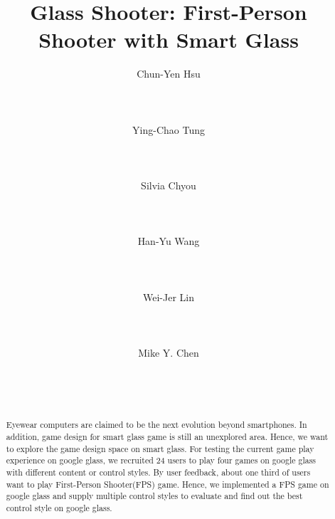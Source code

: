 \documentclass{sigchi}
\begin{document}
\title{Glass Shooter: First-Person Shooter with Smart Glass}

\author{
  \alignauthor Chun-Yen Hsu\\
    \\
    \\
    \\
  \alignauthor Ying-Chao Tung\\
    \\
    \\
    \\
  \alignauthor Silvia Chyou\\
    \\
    \\
    \\
  \alignauthor Han-Yu Wang\\
    \\
    \\
    \\
  \alignauthor Wei-Jer Lin\\
    \\
    \\
    \\
  \alignauthor Mike Y. Chen\\
    \\
    \\
    \\    
}

\maketitle

\begin{abstract}
Eyewear computers are claimed to be the next evolution beyond smartphones. In addition, game design for smart glass game is still an unexplored area. Hence, we want to explore the game design space on smart glass. For testing the current game play experience on google glass, we recruited 24 users to play four games on google glass with different content or control styles. By user feedback, about one third of users want to play First-Person Shooter(FPS) game. Hence, we implemented a FPS game on google glass and supply multiple control styles to evaluate and find out the best control style on google glass.
\end{abstract}
\end{document}
